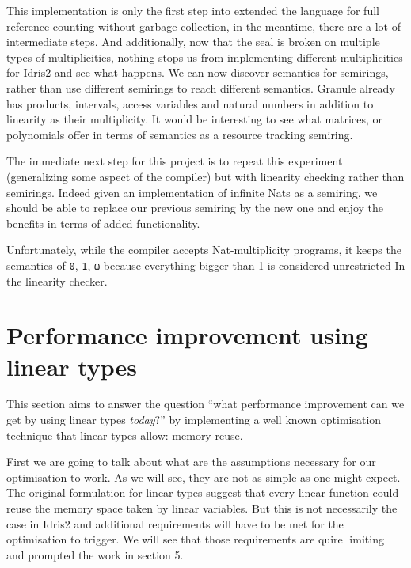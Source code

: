\documentclass[
]{article}
\begin{document}
This implementation is only the first step into extended the language
for full reference counting without garbage collection, in the meantime,
there are a lot of intermediate steps. And additionally, now that the
seal is broken on multiple types of multiplicities, nothing stops us
from implementing different multiplicities for Idris2 and see what
happens. We can now discover semantics for semirings, rather than use
different semirings to reach different semantics. Granule already has
products, intervals, access variables and natural numbers in addition to
linearity as their multiplicity. It would be interesting to see what
matrices, or polynomials offer in terms of semantics as a resource
tracking semiring.

The immediate next step for this project is to repeat this experiment
(generalizing some aspect of the compiler) but with linearity checking
rather than semirings. Indeed given an implementation of infinite Nats
as a semiring, we should be able to replace our previous semiring by the
new one and enjoy the benefits in terms of added functionality.

Unfortunately, while the compiler accepts Nat-multiplicity programs, it
keeps the semantics of \texttt{0}, \texttt{1}, \texttt{ω} because
everything bigger than 1 is considered unrestricted In the linearity
checker.

\newpage

\hypertarget{performance-improvement-using-linear-types}{%
\section{Performance improvement using linear
types}\label{performance-improvement-using-linear-types}}

This section aims to answer the question ``what performance improvement
can we get by using linear types \emph{today}?'' by implementing a well
known optimisation technique that linear types allow: memory reuse.

First we are going to talk about what are the assumptions necessary for
our optimisation to work. As we will see, they are not as simple as one
might expect. The original formulation for linear types suggest that
every linear function could reuse the memory space taken by linear
variables. But this is not necessarily the case in Idris2 and additional
requirements will have to be met for the optimisation to trigger. We
will see that those requirements are quire limiting and prompted the
work in section 5.
\end{document}
